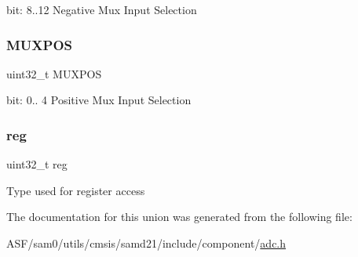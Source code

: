 bit\+: 8..12 Negative Mux Input Selection \mbox{\label{union_a_d_c___i_n_p_u_t_c_t_r_l___type_a393cedfc831a74b6c60b3b2e1996b6e7}} 
\subsubsection{\texorpdfstring{MUXPOS}{MUXPOS}}
{\footnotesize\ttfamily uint32\+\_\+t M\+U\+X\+P\+OS}

bit\+: 0.. 4 Positive Mux Input Selection \mbox{\label{union_a_d_c___i_n_p_u_t_c_t_r_l___type_a6b91636401516a477989a336376d7b40}} 
\subsubsection{\texorpdfstring{reg}{reg}}
{\footnotesize\ttfamily uint32\+\_\+t reg}

Type used for register access 

The documentation for this union was generated from the following file\+:\begin{DoxyCompactItemize}
\item 
A\+S\+F/sam0/utils/cmsis/samd21/include/component/\mbox{\hyperlink{component_2adc_8h}{adc.\+h}}\end{DoxyCompactItemize}
